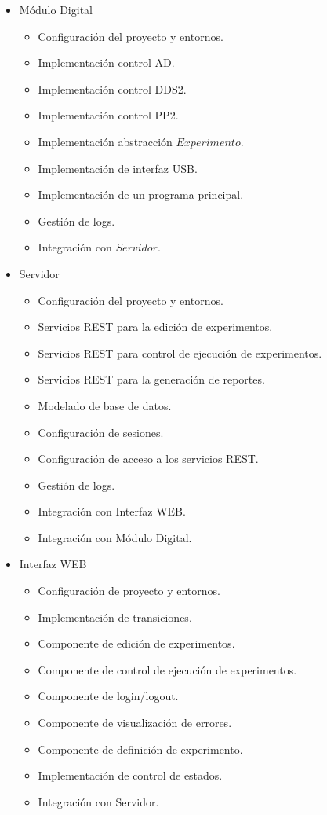 \begin{itemize}
    
    \item M\'odulo Digital
    \begin{itemize}
        \item Configuraci\'on del proyecto y entornos.
        \item Implementaci\'on control AD. 
        \item Implementaci\'on control DDS2.
        \item Implementaci\'on control PP2.
        \item Implementaci\'on abstracci\'on $Experimento$.
        \item Implementaci\'on de interfaz USB.
        \item Implementaci\'on de un programa principal.
        \item Gesti\'on de logs.
        \item Integraci\'on con $Servidor$.
    \end{itemize}

    \item Servidor
        \begin{itemize}
        \item Configuraci\'on del proyecto y entornos.
        \item Servicios REST para la edici\'on de experimentos.
        \item Servicios REST para control de ejecuci\'on de experimentos.
        \item Servicios REST para la generaci\'on de reportes.
        \item Modelado de base de datos. 
        \item Configuraci\'on de sesiones.
        \item Configuraci\'on de acceso a los servicios REST.
        \item Gesti\'on de logs.
        \item Integraci\'on con Interfaz WEB.
        \item Integraci\'on con M\'odulo Digital.
        \end{itemize}
    \item Interfaz WEB
        \begin{itemize}
        \item Configuraci\'on de proyecto y entornos.
        \item Implementaci\'on de transiciones.
        \item Componente de edici\'on de experimentos.
        \item Componente de control de ejecuci\'on de experimentos.
        \item Componente de login/logout.
        \item Componente de visualizaci\'on de errores.
        \item Componente de definici\'on de experimento.
        \item Implementaci\'on de control de estados.
        \item Integraci\'on con Servidor.
        \end{itemize}
    \end{itemize}
\newpage